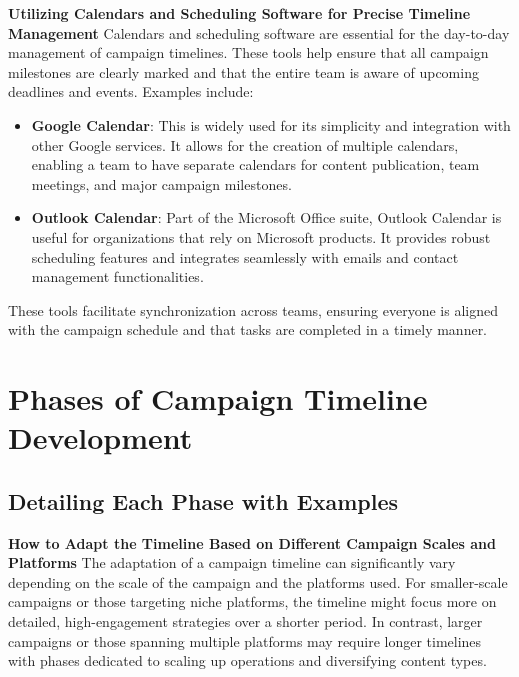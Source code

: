 \documentclass[
]{book}
\providecommand{\tightlist}{%
  \setlength{\itemsep}{0pt}\setlength{\parskip}{0pt}}
\begin{document}
\textbf{Utilizing Calendars and Scheduling Software for Precise Timeline Management}
Calendars and scheduling software are essential for the day-to-day management of campaign timelines. These tools help ensure that all campaign milestones are clearly marked and that the entire team is aware of upcoming deadlines and events. Examples include:

\begin{itemize}
\tightlist
\item
  \textbf{Google Calendar}: This is widely used for its simplicity and integration with other Google services. It allows for the creation of multiple calendars, enabling a team to have separate calendars for content publication, team meetings, and major campaign milestones.
\item
  \textbf{Outlook Calendar}: Part of the Microsoft Office suite, Outlook Calendar is useful for organizations that rely on Microsoft products. It provides robust scheduling features and integrates seamlessly with emails and contact management functionalities.
\end{itemize}

These tools facilitate synchronization across teams, ensuring everyone is aligned with the campaign schedule and that tasks are completed in a timely manner.

\hypertarget{phases-of-campaign-timeline-development}{%
\section{Phases of Campaign Timeline Development}\label{phases-of-campaign-timeline-development}}

\hypertarget{detailing-each-phase-with-examples}{%
\subsection*{Detailing Each Phase with Examples}\label{detailing-each-phase-with-examples}}

\textbf{How to Adapt the Timeline Based on Different Campaign Scales and Platforms}
The adaptation of a campaign timeline can significantly vary depending on the scale of the campaign and the platforms used. For smaller-scale campaigns or those targeting niche platforms, the timeline might focus more on detailed, high-engagement strategies over a shorter period. In contrast, larger campaigns or those spanning multiple platforms may require longer timelines with phases dedicated to scaling up operations and diversifying content types.
\end{document}
